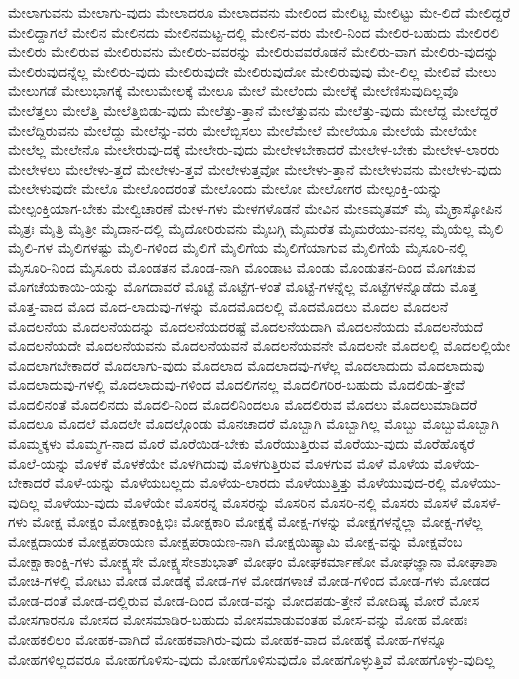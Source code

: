 {ಮೇಲಾಗುವನು
ಮೇಲಾಗು-ವುದು
ಮೇಲಾದರೂ
ಮೇಲಾದವನು
ಮೇಲಿಂದ
ಮೇಲಿಟ್ಟ
ಮೇಲಿಟ್ಟು
ಮೇ-ಲಿದೆ
ಮೇಲಿದ್ದರೆ
ಮೇಲಿದ್ದಾಗಲೆ
ಮೇಲಿನ
ಮೇಲಿನದು
ಮೇಲಿನಮಟ್ಟ-ದಲ್ಲಿ
ಮೇಲಿನ-ವರು
ಮೇಲಿ-ನಿಂದ
ಮೇಲಿರ-ಬಹುದು
ಮೇಲಿರಲಿ
ಮೇಲಿರು
ಮೇಲಿರುವ
ಮೇಲಿರುವನು
ಮೇಲಿರು-ವವರನ್ನು
ಮೇಲಿರುವವರೊಡನೆ
ಮೇಲಿರು-ವಾಗ
ಮೇಲಿರು-ವುದನ್ನು
ಮೇಲಿರುವುದನ್ನೆಲ್ಲ
ಮೇಲಿರು-ವುದು
ಮೇಲಿರುವುದೇ
ಮೇಲಿರುವುದೋ
ಮೇಲಿರುವುವು
ಮೇ-ಲಿಲ್ಲ
ಮೇಲಿವೆ
ಮೇಲು
ಮೇಲುಗಡೆ
ಮೇಲುಭಾಗಕ್ಕೆ
ಮೇಲುಮೇಲಕ್ಕೆ
ಮೇಲೂ
ಮೇಲೆ
ಮೇಲೆಂದು
ಮೇಲೆಕ್ಕೆ
ಮೇಲೆಣಿಸುವುದಿಲ್ಲವೊ
ಮೇಲೆತ್ತಲು
ಮೇಲೆತ್ತಿ
ಮೇಲೆತ್ತಿಬಿಡು-ವುದು
ಮೇಲೆತ್ತು-ತ್ತಾನೆ
ಮೇಲೆತ್ತುವನು
ಮೇಲೆತ್ತು-ವುದು
ಮೇಲೆದ್ದ
ಮೇಲೆದ್ದರೆ
ಮೇಲೆದ್ದಿರುವನು
ಮೇಲೆದ್ದು
ಮೇಲೆನ್ನು-ವರು
ಮೇಲೆಬ್ಬಿಸಲು
ಮೇಲೆಮೇಲೆ
ಮೇಲೆಯೂ
ಮೇಲೆಯೆ
ಮೇಲೆಯೇ
ಮೇಲೆಲ್ಲ
ಮೇಲೇನೊ
ಮೇಲೇರುವು-ದಕ್ಕೆ
ಮೇಲೇರು-ವುದು
ಮೇಲೇಳಬೇಕಾದರೆ
ಮೇಲೇಳ-ಬೇಕು
ಮೇಲೇಳ-ಲಾರರು
ಮೇಲೇಳಲು
ಮೇಲೇಳು-ತ್ತದೆ
ಮೇಲೇಳು-ತ್ತವೆ
ಮೇಲೇಳುತ್ತವೋ
ಮೇಲೇಳು-ತ್ತಾನೆ
ಮೇಲೇಳುವನು
ಮೇಲೇಳು-ವುದು
ಮೇಲೇಳುವುದೇ
ಮೇಲೊ
ಮೇಲೊಂದರಂತೆ
ಮೇಲೊಂದು
ಮೇಲೋ
ಮೇಲೋಗರ
ಮೇಲ್ಪಂಕ್ತಿ-ಯನ್ನು
ಮೇಲ್ಪಂಕ್ತಿಯಾಗ-ಬೇಕು
ಮೇಲ್ವಿಚಾರಣೆ
ಮೇಳ-ಗಳು
ಮೇಳಗಳೊಡನೆ
ಮೇವಿನ
ಮೇಽಮೃತಮ್
ಮೈ
ಮೈಕ್ರಾಸ್ಕೋಪಿನ
ಮೈತ್ರಃ
ಮೈತ್ರಿ
ಮೈತ್ರೀ
ಮೈದಾನ-ದಲ್ಲಿ
ಮೈದೋರಿರುವನು
ಮೈಬಗ್ಗಿ
ಮೈಮರೆತ
ಮೈಮರೆಯು-ವನಲ್ಲ
ಮೈಯೆಲ್ಲ
ಮೈಲಿ
ಮೈಲಿ-ಗಳ
ಮೈಲಿಗಳಷ್ಟು
ಮೈಲಿ-ಗಳಿಂದ
ಮೈಲಿಗೆ
ಮೈಲಿಗೆಯ
ಮೈಲಿಗೆಯಾಗುವ
ಮೈಲಿಗೆಯೆ
ಮೈಸೂರಿ-ನಲ್ಲಿ
ಮೈಸೂರಿ-ನಿಂದ
ಮೈಸೂರು
ಮೊಂಡತನ
ಮೊಂಡ-ನಾಗಿ
ಮೊಂಡಾಟ
ಮೊಂಡು
ಮೊಂಡುತನ-ದಿಂದ
ಮೊಗಚುವ
ಮೊಗಚೆಯಕಾಯಿ-ಯನ್ನು
ಮೊಗದಾವರೆ
ಮೊಟ್ಟೆ
ಮೊಟ್ಟೆಗ-ಳಂತೆ
ಮೊಟ್ಟೆ-ಗಳನ್ನೆಲ್ಲ
ಮೊಟ್ಟೆಗಳನ್ನೊಡೆದು
ಮೊತ್ತ
ಮೊತ್ತ-ವಾದ
ಮೊದ
ಮೊದ-ಲಾದುವು-ಗಳನ್ನು
ಮೊದಮೊದಲಲ್ಲಿ
ಮೊದಮೊದಲು
ಮೊದಲ
ಮೊದಲನೆ
ಮೊದಲನೆಯ
ಮೊದಲನೆಯದನ್ನು
ಮೊದಲನೆಯದರಷ್ಟೆ
ಮೊದಲನೆಯದಾಗಿ
ಮೊದಲನೆಯದು
ಮೊದಲನೆಯದೆ
ಮೊದಲನೆಯದೇ
ಮೊದಲನೆಯವನು
ಮೊದಲನೆಯವನೆ
ಮೊದಲನೆಯವನೇ
ಮೊದಲನೇ
ಮೊದಲಲ್ಲಿ
ಮೊದಲಲ್ಲಿಯೇ
ಮೊದಲಾಗಬೇಕಾದರೆ
ಮೊದಲಾಗು-ವುದು
ಮೊದಲಾದ
ಮೊದಲಾದವು-ಗಳೆಲ್ಲ
ಮೊದಲಾದುದು
ಮೊದಲಾದುವು
ಮೊದಲಾದುವು-ಗಳಲ್ಲಿ
ಮೊದಲಾದುವು-ಗಳಿಂದ
ಮೊದಲಿಗನಲ್ಲ
ಮೊದಲಿಗರಿರ-ಬಹುದು
ಮೊದಲಿಡು-ತ್ತೇವೆ
ಮೊದಲಿನಂತೆ
ಮೊದಲಿನದು
ಮೊದಲಿ-ನಿಂದ
ಮೊದಲಿನಿಂದಲೂ
ಮೊದಲಿರುವ
ಮೊದಲು
ಮೊದಲುಮಾಡಿದರೆ
ಮೊದಲೂ
ಮೊದಲೆ
ಮೊದಲೇ
ಮೊದಲ್ಗೊಂಡು
ಮೊನಚಾದರೆ
ಮೊಬ್ಬಾಗಿ
ಮೊಬ್ಬಾಗಿಲ್ಲ
ಮೊಬ್ಬು
ಮೊಬ್ಬುಮೊಬ್ಬಾಗಿ
ಮೊಮ್ಮಕ್ಕಳು
ಮೊಮ್ಮಗ-ನಾದ
ಮೊರೆ
ಮೊರೆಯಿಡ-ಬೇಕು
ಮೊರೆಯುತ್ತಿರುವ
ಮೊರೆಯು-ವುದು
ಮೊರೆಹೊಕ್ಕರೆ
ಮೊಲೆ-ಯನ್ನು
ಮೊಳಕೆ
ಮೊಳಕೆಯೇ
ಮೊಳಗಿದುವು
ಮೊಳಗುತ್ತಿರುವ
ಮೊಳಗುವ
ಮೊಳೆ
ಮೊಳೆಯ
ಮೊಳೆಯ-ಬೇಕಾದರೆ
ಮೊಳೆ-ಯನ್ನು
ಮೊಳೆಯಬಲ್ಲದು
ಮೊಳೆಯ-ಲಾರದು
ಮೊಳೆಯುತ್ತಿತ್ತು
ಮೊಳೆಯುವುದ-ರಲ್ಲಿ
ಮೊಳೆಯು-ವುದಿಲ್ಲ
ಮೊಳೆಯು-ವುದು
ಮೊಳೆಯೇ
ಮೊಸರನ್ನ
ಮೊಸರನ್ನು
ಮೊಸರಿನ
ಮೊಸರಿ-ನಲ್ಲಿ
ಮೊಸರು
ಮೊಸಳೆ
ಮೊಸಳೆ-ಗಳು
ಮೋಕ್ಷ
ಮೋಕ್ಷಂ
ಮೋಕ್ಷಕಾಂಕ್ಷಿಭಿಃ
ಮೋಕ್ಷಕಾರಿ
ಮೋಕ್ಷಕ್ಕೆ
ಮೋಕ್ಷ-ಗಳನ್ನು
ಮೋಕ್ಷಗಳನ್ನೆಲ್ಲಾ
ಮೋಕ್ಷ-ಗಳೆಲ್ಲ
ಮೋಕ್ಷದಾಯಕ
ಮೋಕ್ಷಪರಾಯಣ
ಮೋಕ್ಷಪರಾಯಣ-ನಾಗಿ
ಮೋಕ್ಷಯಿಷ್ಯಾಮಿ
ಮೋಕ್ಷ-ವನ್ನು
ಮೋಕ್ಷವೆಂಬ
ಮೋಕ್ಷಾಕಾಂಕ್ಷಿ-ಗಳು
ಮೋಕ್ಷ್ಯಸೇ
ಮೋಕ್ಷ್ಯಸೇಽಶುಭಾತ್
ಮೋಘಂ
ಮೋಘಕರ್ಮಾಣೋ
ಮೋಘಜ್ಞಾನಾ
ಮೋಘಾಶಾ
ಮೋಚಿ-ಗಳಲ್ಲಿ
ಮೋಟು
ಮೋಡ
ಮೋಡಕ್ಕೆ
ಮೋಡ-ಗಳ
ಮೋಡಗಳಾಚೆ
ಮೋಡ-ಗಳಿಂದ
ಮೋಡ-ಗಳು
ಮೋಡದ
ಮೋಡ-ದಂತೆ
ಮೋಡ-ದಲ್ಲಿರುವ
ಮೋಡ-ದಿಂದ
ಮೋಡ-ವನ್ನು
ಮೋದಪಡು-ತ್ತೇನೆ
ಮೋದಿಷ್ಯ
ಮೋರೆ
ಮೋಸ
ಮೋಸಗಾರನೂ
ಮೋಸದ
ಮೋಸಮಾಡಿರ-ಬಹುದು
ಮೋಸಮಾಡುವಂತಹ
ಮೋಸ-ವನ್ನು
ಮೋಹ
ಮೋಹಃ
ಮೋಹಕಲಿಲಂ
ಮೋಹಕ-ವಾಗಿದೆ
ಮೋಹಕವಾಗಿರು-ವುದು
ಮೋಹಕ-ವಾದ
ಮೋಹಕ್ಕೆ
ಮೋಹ-ಗಳನ್ನೂ
ಮೋಹಗಳಿಲ್ಲದವರೂ
ಮೋಹಗೊಳಿಸು-ವುದು
ಮೋಹಗೊಳಿಸುವುದೊ
ಮೋಹಗೊಳ್ಳುತ್ತಿವೆ
ಮೋಹಗೊಳ್ಳು-ವುದಿಲ್ಲ
}
